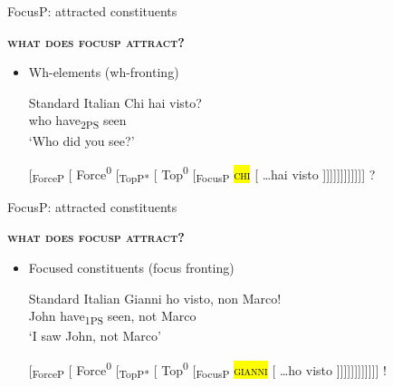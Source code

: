 \documentclass[lesson_slides]{subfiles}
\begin{document}
\begin{frame}[c]{FocusP: attracted constituents}

    \textbf{\textsc{what does focusp attract?}} \pause

    \begin{itemize}
        \item [\ding{227}] Wh-elements (wh-fronting) \pause

        \begin{exe}
        \ex Standard Italian
            \gll Chi hai visto?\\
                who have\textsubscript{2PS} seen\\
            \glt \vspace*{-2mm} ‘Who did you see?’
        \label{ita}
        \end{exe} \pause
    
        [\textsubscript{ForceP} [ Force\textsuperscript{0} [\textsubscript{TopP*} [ Top\textsuperscript{0} [\textsubscript{FocusP} \textsc{\hl{chi}} [ \dots hai visto ]]]]]]]]]]]] ?
        
    \end{itemize}
    
  
\end{frame}
\begin{frame}[c]{FocusP: attracted constituents}

    \textbf{\textsc{what does focusp attract?}} \pause

    \begin{itemize}
        \item [\ding{227}] Focused constituents (focus fronting) \pause

        \begin{exe}
            \ex Standard Italian
                \gll Gianni ho visto, non Marco!\\
                    John have\textsubscript{1PS} seen, not Marco\\
                \glt \vspace*{-2mm} ‘I saw John, not Marco’
            \label{ita}
        \end{exe} \pause
    
        [\textsubscript{ForceP} [ Force\textsuperscript{0} [\textsubscript{TopP*} [ Top\textsuperscript{0} [\textsubscript{FocusP} \textsc{\hl{gianni}} [ \dots ho visto ]]]]]]]]]]]] !
        
    \end{itemize}
    
  
\end{frame}
\end{document}
